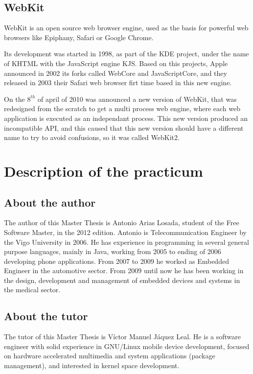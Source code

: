 \documentclass[a4paper,11pt,openany]{report}
\begin{document}
\section{WebKit}
WebKit\cite{webkit} is an open source web browser engine, used as the basis for powerful web browsers like Epiphany, Safari or Google Chrome.

Its development was started in 1998, as part of the KDE project, under the name of KHTML with the JavaScript engine KJS. Based on this projects, Apple announced in 2002 its forks called WebCore and JavaScriptCore, and they released in 2003 their Safari web browser firt time based in this new engine.

On the $8^{th}$ of april of 2010 was announced a new version of WebKit, that was redesigned from the scratch to get a multi process web engine, where each web application is executed as an independant process. This new version produced an incompatible API, and this caused that this new version should have a different name to try to avoid confusions, so it was called WebKit2.

\chapter{Description of the practicum}

\section{About the author}
The author of this Master Thesis is Antonio Arias Losada, student of the Free Software Master, in the 2012 edition.
Antonio is Telecommunication Engineer by the Vigo University in 2006. He has experience in programming in several general purpose languages, mainly in Java, working from 2005 to ending of 2006 developing phone applications. From 2007 to 2009 he worked as Embedded Engineer in the automotive sector. From 2009 until now he has been working in the design, development and management of embedded devices and systems in the medical sector.

\section{About the tutor}
The tutor of this Master Thesis is V\'ictor Manuel J\'aquez Leal. He is a software engineer with solid experience in GNU/Linux mobile device development, focused on hardware accelerated multimedia and system applications (package management), and interested in kernel space development.
\end{document}
